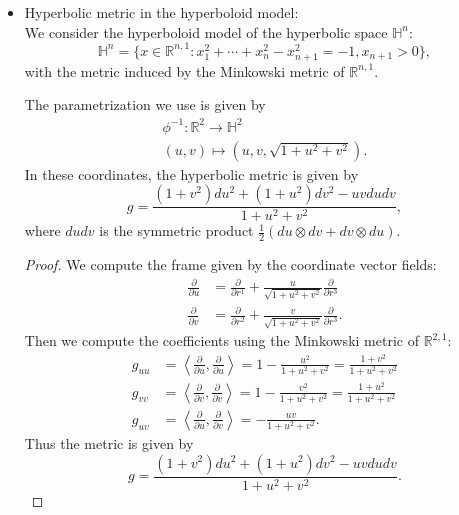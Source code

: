 \documentclass{report}
\begin{document}
\begin{itemize}
    \item Hyperbolic metric in the hyperboloid model:\\
    We consider the hyperboloid model of the hyperbolic space $\mathbb H^n$:
    \[
    \mathbb H^n = \{x \in \mathbb R^{n,1}: x_1^2 + \cdots + x_n^2 - x_{n+1}^2 = -1, x_{n+1} > 0\},
    \]
    with the metric induced by the Minkowski metric of $\mathbb R^{n,1}$.
    
    The parametrization we use is given by
    \begin{align*}
        \phi^{-1}: \mathbb R^2 \to \mathbb H^2\\
        (u,v) \mapsto (u, v, \sqrt{1 + u^2 + v^2}).
    \end{align*}
    In these coordinates, the hyperbolic metric is given by
    \[
    g = \frac{(1 + v^2) du^2 + (1 + u^2) dv^2 - uv du dv}{1 + u^2 + v^2},
    \]
    where $du dv$ is the symmetric product $\frac{1}{2}(du \otimes dv + dv \otimes du)$.
    \begin{proof}
        We compute the frame given by the coordinate vector fields:
        \begin{align*}
            \frac{\partial}{\partial u} &= \frac{\partial}{\partial r^1} + \frac{u}{\sqrt{1 + u^2 + v^2}} \frac{\partial}{\partial r^3}\\
            \frac{\partial}{\partial v} &= \frac{\partial}{\partial r^2} + \frac{v}{\sqrt{1 + u^2 + v^2}} \frac{\partial}{\partial r^3}.
        \end{align*}
        Then we compute the coefficients using the Minkowski metric of $\mathbb R^{2,1}$:
    \begin{align*}
        g_{uu} &= \left\langle \frac{\partial}{\partial u}, \frac{\partial}{\partial u} \right\rangle = 1 - \frac{u^2}{1 + u^2 + v^2} = \frac{1 + v^2}{1 + u^2 + v^2}\\
        g_{vv} &= \left\langle \frac{\partial}{\partial v}, \frac{\partial}{\partial v} \right\rangle = 1 - \frac{v^2}{1 + u^2 + v^2} = \frac{1 + u^2}{1 + u^2 + v^2}\\
        g_{uv} &= \left\langle \frac{\partial}{\partial u}, \frac{\partial}{\partial v} \right\rangle = - \frac{uv}{1 + u^2 + v^2}.
    \end{align*}
    Thus the metric is given by
    \[
    g = \frac{(1 + v^2) du^2 + (1 + u^2) dv^2 - uv du dv}{1 + u^2 + v^2}.
    \]
    \end{proof}
\end{itemize}
\end{document}
